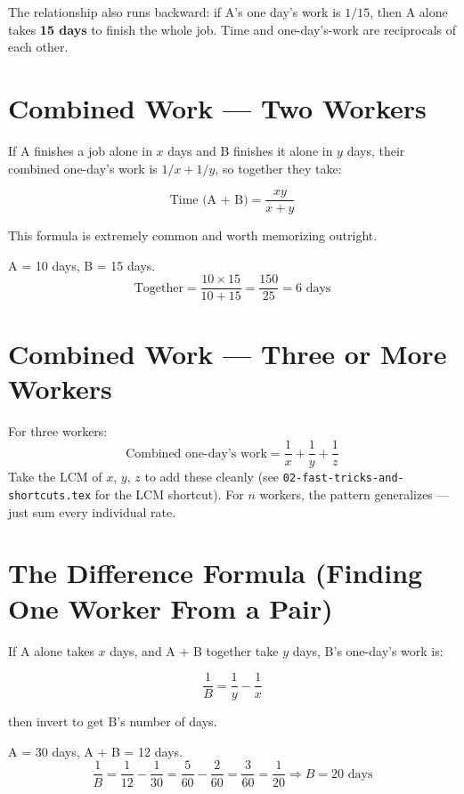 \documentclass[11pt]{article}
\begin{document}
The relationship also runs backward: if A's one day's work is $1/15$, then A alone takes
\textbf{15 days} to finish the whole job. Time and one-day's-work are reciprocals of each other.

\section{Combined Work --- Two Workers}
If A finishes a job alone in $x$ days and B finishes it alone in $y$ days, their combined one-day's
work is $1/x + 1/y$, so together they take:
\begin{formulabox}
\[
\text{Time (A + B)} = \frac{xy}{x+y}
\]
\end{formulabox}
This formula is extremely common and worth memorizing outright.

\begin{examplebox}
A = 10 days, B = 15 days.
\[
\text{Together} = \frac{10 \times 15}{10 + 15} = \frac{150}{25} = 6 \text{ days}
\]
\end{examplebox}

\section{Combined Work --- Three or More Workers}
For three workers:
\[
\text{Combined one-day's work} = \frac{1}{x} + \frac{1}{y} + \frac{1}{z}
\]
Take the LCM of $x$, $y$, $z$ to add these cleanly (see \texttt{02-fast-tricks-and-shortcuts.tex} for
the LCM shortcut). For $n$ workers, the pattern generalizes --- just sum every individual rate.

\section{The Difference Formula (Finding One Worker From a Pair)}
If A alone takes $x$ days, and A + B together take $y$ days, B's one-day's work is:
\begin{formulabox}
\[
\frac{1}{B} = \frac{1}{y} - \frac{1}{x}
\]
\end{formulabox}
then invert to get B's number of days.

\begin{examplebox}
A = 30 days, A + B = 12 days.
\[
\frac{1}{B} = \frac{1}{12} - \frac{1}{30} = \frac{5}{60} - \frac{2}{60} = \frac{3}{60} = \frac{1}{20}
\Rightarrow B = 20 \text{ days}
\]
\end{examplebox}
\end{document}

